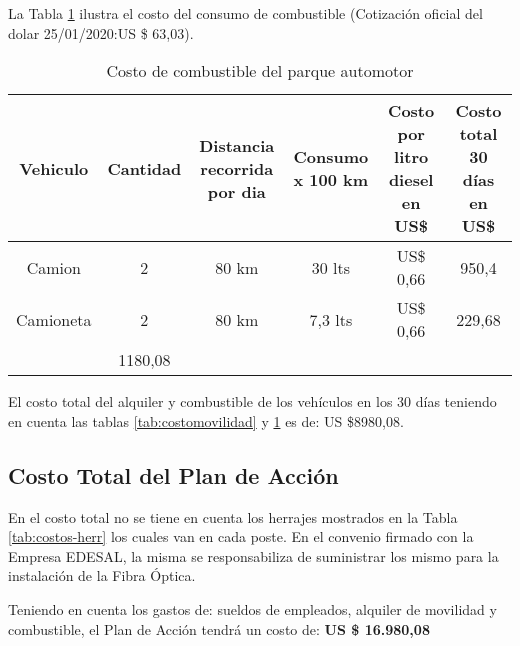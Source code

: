 La Tabla \ref{tab:costocombus} ilustra el costo del consumo de combustible (Cotización oficial del dolar 25/01/2020:US \$ 63,03).


\begin{table}[H]
  \centering
  \tiny
    \begin{tabular}{|c|c|c|c|c|c|}
    \hline
    \rowcolor[rgb]{ .773,  .851,  .945} \textbf{Vehiculo} & \textbf{Cantidad} & \textbf{Distancia recorrida por dia} & \textbf{Consumo x 100 km} & \textbf{Costo por litro diesel en US\$} & \textbf{Costo total 30 días en US\$} \bigstrut\\
    \hline
    Camion & 2     & 80 km & 30 lts & US\$ 0,66 & 950,4 \bigstrut\\
    \hline
    Camioneta & 2     & 80 km & 7,3 lts & US\$ 0,66 & 229,68 \bigstrut\\
    \hline
    \rowcolor[rgb]{ .773,  .851,  .945} \multicolumn{5}{|c|}{\textbf{Total}}  & \cellcolor[rgb]{ 1,  1,  1}1180,08 \bigstrut\\
    \hline
    \end{tabular}%
  \caption{Costo de combustible del parque automotor}
  \label{tab:costocombus}%
\end{table}%








El costo total del alquiler y combustible de los vehículos   en los 30 días teniendo en cuenta las tablas \ref{tab:costomovilidad} y \ref{tab:costocombus} es de: US \$8980,08.


\subsection{Costo Total del Plan de Acción}



En el costo total no se tiene en cuenta los herrajes mostrados en la Tabla \ref{tab:costos-herr} los cuales van en cada poste. En el convenio firmado con la Empresa EDESAL, la misma se responsabiliza de suministrar los mismo para la instalación de la Fibra Óptica. 

Teniendo en cuenta los gastos de: sueldos de empleados, alquiler de movilidad y combustible, el Plan de Acción tendrá un costo de: \textbf{US \$ 16.980,08}





